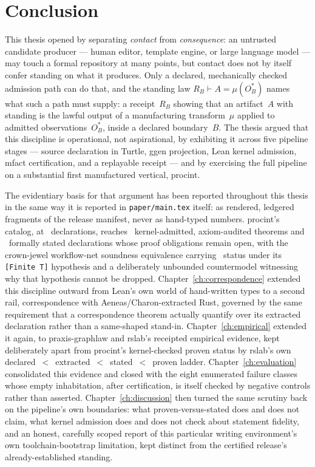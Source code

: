 \chapter{Conclusion}
\label{ch:conclusion}

This thesis opened by separating \emph{contact} from \emph{consequence}:
an untrusted candidate producer --- human editor, template engine, or
large language model --- may touch a formal repository at many points,
but contact does not by itself confer standing on what it produces. Only
a declared, mechanically checked admission path can do that, and the
standing law $R_B \vdash A = \mu(O^*_B)$ names what such a path must
supply: a receipt~$R_B$ showing that an artifact~$A$ with standing is the
lawful output of a manufacturing transform~$\mu$ applied to admitted
observations~$O^*_B$, inside a declared boundary~$B$. The thesis argued
that this discipline is operational, not aspirational, by exhibiting it
across five pipeline stages --- source declaration in Turtle, ggen
projection, Lean kernel admission, \textsf{mfact} certification, and a
replayable receipt --- and by exercising the full pipeline on a
substantial first manufactured vertical, \textsf{procint}.

The evidentiary basis for that argument has been reported throughout
this thesis in the same way it is reported in \texttt{paper/main.tex}
itself: as rendered, ledgered fragments of the release manifest, never as
hand-typed numbers. \textsf{procint}'s catalog, at \TotalDecls\
declarations, reaches \KernelTheorems\ kernel-admitted, axiom-audited
theorems and \StatedCount\ formally stated declarations whose proof
obligations remain open, with the crown-jewel workflow-net soundness
equivalence carrying \CrownJewelStatus\ status under its
\texttt{[Finite~T]} hypothesis and a deliberately unbounded countermodel
witnessing why that hypothesis cannot be dropped. Chapter~\ref{ch:correspondence}
extended this discipline outward from Lean's own world of hand-written
types to a second rail, correspondence with Aeneas/Charon-extracted Rust,
governed by the same requirement that a correspondence theorem actually
quantify over its extracted declaration rather than a same-shaped
stand-in. Chapter~\ref{ch:empirical} extended it again, to praxis-graphlaw
and rslab's receipted empirical evidence, kept deliberately apart from
\textsf{procint}'s kernel-checked proven status by rslab's own
declared~$<$~extracted~$<$~stated~$<$~proven ladder. Chapter~\ref{ch:evaluation}
consolidated this evidence and closed with the eight enumerated failure
classes whose empty inhabitation, after certification, is itself checked
by negative controls rather than asserted. Chapter~\ref{ch:discussion}
then turned the same scrutiny back on the pipeline's own boundaries:
what proven-versus-stated does and does not claim, what kernel admission
does and does not check about statement fidelity, and an honest,
carefully scoped report of this particular writing environment's own
toolchain-bootstrap limitation, kept distinct from the certified
release's already-established standing.

